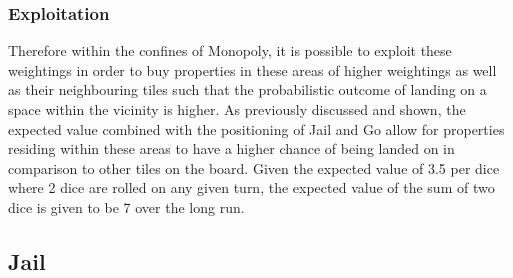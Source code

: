 \documentclass[12pt]{article}
\begin{document}
\subsubsection{Exploitation}
Therefore within the confines of Monopoly, it is possible to exploit these weightings in order to buy properties in these areas of higher weightings as well as their neighbouring tiles such that the probabilistic outcome of landing on a space within the vicinity is higher. As previously discussed and shown, the expected value combined with the positioning of Jail and Go allow for properties residing within these areas to have a higher chance of being landed on in comparison to other tiles on the board. Given the expected value of 3.5 per dice where 2 dice are rolled on any given turn, the expected value of the sum of two dice is given to be 7 over the long run.
\subsection{Jail}
\end{document}
